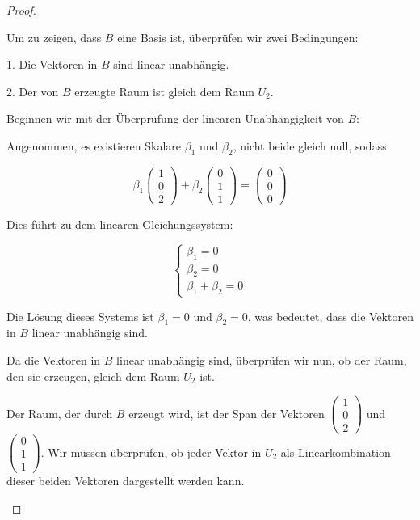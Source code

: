 \documentclass{../problemset}
\begin{document}
\begin{problem}
\begin{proof}
\begin{enumerate}
		      Um zu zeigen, dass $B$ eine Basis ist, überprüfen wir zwei Bedingungen:

		      1. Die Vektoren in $B$ sind linear unabhängig.

		      2. Der von $B$ erzeugte Raum ist gleich dem Raum $U_2$.

		      Beginnen wir mit der Überprüfung der linearen Unabhängigkeit von $B$:

		      Angenommen, es existieren Skalare $\beta_1$ und $\beta_2$, nicht beide gleich null, sodass

		      \[
			      \beta_1 \begin{pmatrix} 1 \\ 0 \\ 2 \end{pmatrix} + \beta_2 \begin{pmatrix} 0 \\ 1 \\ 1 \end{pmatrix} = \begin{pmatrix} 0 \\ 0 \\ 0 \end{pmatrix}
		      \]

		      Dies führt zu dem linearen Gleichungssystem:

		      \[
			      \begin{cases}
				      \beta_1 = 0 \\
				      \beta_2 = 0 \\
				      \beta_1 + \beta_2 = 0
			      \end{cases}
		      \]

		      Die Lösung dieses Systems ist $\beta_1 = 0$ und $\beta_2 = 0$, was bedeutet, dass die Vektoren in $B$ linear unabhängig sind.

		      Da die Vektoren in $B$ linear unabhängig sind, überprüfen wir nun, ob der Raum, den sie erzeugen, gleich dem Raum $U_2$ ist.

		      Der Raum, der durch $B$ erzeugt wird, ist der Span der Vektoren $\begin{pmatrix} 1 \\ 0 \\ 2 \end{pmatrix}$ und $\begin{pmatrix} 0 \\ 1 \\ 1 \end{pmatrix}$. Wir müssen überprüfen, ob jeder Vektor in $U_2$ als Linearkombination dieser beiden Vektoren dargestellt werden kann.


\end{enumerate}
\end{proof}
\end{problem}
\end{document}
